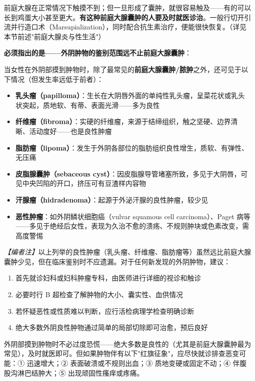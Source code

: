 \begin{enumerate}
前庭大腺在正常情况下触摸不到；但一旦形成了囊肿，就很容易触及——有的可以长到鸡蛋大小甚至更大。\textbf{有这种前庭大腺囊肿的人要及时就医诊治}。一般行切开引流并行造口术（Marsupialization），同时配合抗生素治疗，便能很快恢复。（详见本节前述"前庭大腺炎与性生活"）

\vspace{0.5em}
\noindent\textbf{必须指出的是——外阴肿物的鉴别范围远不止前庭大腺囊肿}：

当女性在外阴部摸到肿物时，除了最常见的\textbf{前庭大腺囊肿/脓肿}之外，还可见于以下情况（但发生率远低于前者）：

\begin{itemize}
	\item \textbf{乳头瘤（papilloma）}：生长在大阴唇外面的单纯性乳头瘤，呈菜花状或乳头状突起，质地软、有蒂、表面光滑——多为良性
	\item \textbf{纤维瘤（fibroma）}：实硬的纤维瘤，来源于结缔组织，触之坚硬、边界清晰、活动度好——也是良性肿瘤
	\item \textbf{脂肪瘤（lipoma）}：发生于外阴各部位的脂肪组织良性增生，质软、有弹性、无压痛
	\item \textbf{皮脂腺囊肿（sebaceous cyst）}：因皮脂腺导管堵塞所致，多见于大阴唇，可见中央凹陷的开口，挤压可有豆渣样内容物
	\item \textbf{汗腺瘤（hidradenoma）}：起源于外泌汗腺的良性肿瘤，较少见
	\item \textbf{恶性肿瘤}：如外阴鳞状细胞癌（vulvar squamous cell carcinoma）、Paget 病等——多见于绝经后女性，表现为久治不愈的溃疡、不规则肿块或色素改变，需高度警惕
\end{itemize}

\noindent\textit{【编者注】}以上列举的良性肿瘤（乳头瘤、纤维瘤、脂肪瘤等）虽然远比前庭大腺囊肿少见，但在临床鉴别时不应遗漏。对于任何新发现的外阴肿物，建议：
\begin{enumerate}
	\item 首先就诊妇科或妇科肿瘤专科，由医师进行详细的视诊和触诊
	\item 必要时行 B 超检查了解肿物的大小、囊实性、血供情况
	\item 若怀疑恶性或性质难以判断，应行活检病理学检查明确诊断
	\item 绝大多数外阴良性肿物通过简单的局部切除即可治愈，预后良好
\end{enumerate}

\begin{tcolorbox}[colback=pink!5!white,colframe=red!50!black,title=贴心小叮咛]
外阴部摸到肿物时不必过度恐慌——绝大多数是良性的（尤其是前庭大腺囊肿最为常见），及时就医即可。但如果肿物伴有以下"红旗征象"，应尽快就诊排查恶变可能：① 迅速增大；② 表面破溃或不规则出血；③ 质地变硬或固定不动；④ 伴腹股沟淋巴结肿大；⑤ 出现顽固性瘙痒或疼痛。
\end{tcolorbox}


\end{enumerate}
